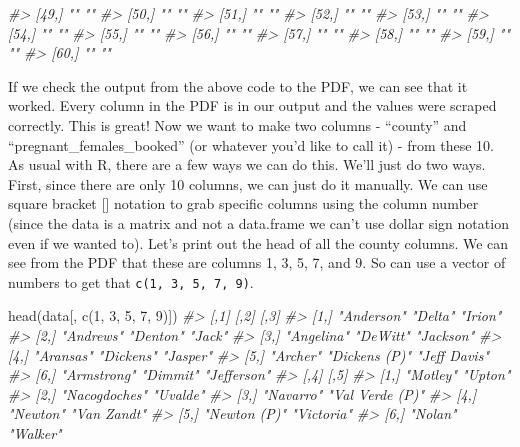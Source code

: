 \documentclass[
  12pt,
  openany]{book}
\newenvironment{Shaded}{\begin{snugshade}}{\end{snugshade}}
\newcommand{\CommentTok}[1]{\textcolor[rgb]{0.37,0.37,0.37}{\textit{#1}}}
\newcommand{\DecValTok}[1]{\textcolor[rgb]{0.06,0.06,0.06}{#1}}
\newcommand{\FunctionTok}[1]{\textcolor[rgb]{0,0,0}{#1}}
\newcommand{\NormalTok}[1]{#1}
\begin{document}
\begin{Shaded}
\begin{Highlighting}[]
\CommentTok{\#\textgreater{} [49,] ""              ""   }
\CommentTok{\#\textgreater{} [50,] ""              ""   }
\CommentTok{\#\textgreater{} [51,] ""              ""   }
\CommentTok{\#\textgreater{} [52,] ""              ""   }
\CommentTok{\#\textgreater{} [53,] ""              ""   }
\CommentTok{\#\textgreater{} [54,] ""              ""   }
\CommentTok{\#\textgreater{} [55,] ""              ""   }
\CommentTok{\#\textgreater{} [56,] ""              ""   }
\CommentTok{\#\textgreater{} [57,] ""              ""   }
\CommentTok{\#\textgreater{} [58,] ""              ""   }
\CommentTok{\#\textgreater{} [59,] ""              ""   }
\CommentTok{\#\textgreater{} [60,] ""              ""}
\end{Highlighting}
\end{Shaded}

If we check the output from the above code to the PDF, we can see that it worked. Every column in the PDF is in our output and the values were scraped correctly. This is great! Now we want to make two columns - ``county'' and ``pregnant\_females\_booked'' (or whatever you'd like to call it) - from these 10. As usual with R, there are a few ways we can do this. We'll just do two ways. First, since there are only 10 columns, we can just do it manually. We can use square bracket {[}{]} notation to grab specific columns using the column number (since the data is a matrix and not a data.frame we can't use dollar sign notation even if we wanted to). Let's print out the head of all the county columns. We can see from the PDF that these are columns 1, 3, 5, 7, and 9. So can use a vector of numbers to get that \texttt{c(1,\ 3,\ 5,\ 7,\ 9)}.

\begin{Shaded}
\begin{Highlighting}[]
\FunctionTok{head}\NormalTok{(data[, }\FunctionTok{c}\NormalTok{(}\DecValTok{1}\NormalTok{, }\DecValTok{3}\NormalTok{, }\DecValTok{5}\NormalTok{, }\DecValTok{7}\NormalTok{, }\DecValTok{9}\NormalTok{)])}
\CommentTok{\#\textgreater{}      [,1]        [,2]          [,3]        }
\CommentTok{\#\textgreater{} [1,] "Anderson"  "Delta"       "Irion"     }
\CommentTok{\#\textgreater{} [2,] "Andrews"   "Denton"      "Jack"      }
\CommentTok{\#\textgreater{} [3,] "Angelina"  "DeWitt"      "Jackson"   }
\CommentTok{\#\textgreater{} [4,] "Aransas"   "Dickens"     "Jasper"    }
\CommentTok{\#\textgreater{} [5,] "Archer"    "Dickens (P)" "Jeff Davis"}
\CommentTok{\#\textgreater{} [6,] "Armstrong" "Dimmit"      "Jefferson" }
\CommentTok{\#\textgreater{}      [,4]          [,5]           }
\CommentTok{\#\textgreater{} [1,] "Motley"      "Upton"        }
\CommentTok{\#\textgreater{} [2,] "Nacogdoches" "Uvalde"       }
\CommentTok{\#\textgreater{} [3,] "Navarro"     "Val Verde (P)"}
\CommentTok{\#\textgreater{} [4,] "Newton"      "Van Zandt"    }
\CommentTok{\#\textgreater{} [5,] "Newton (P)"  "Victoria"     }
\CommentTok{\#\textgreater{} [6,] "Nolan"       "Walker"}
\end{Highlighting}
\end{Shaded}
\end{document}
